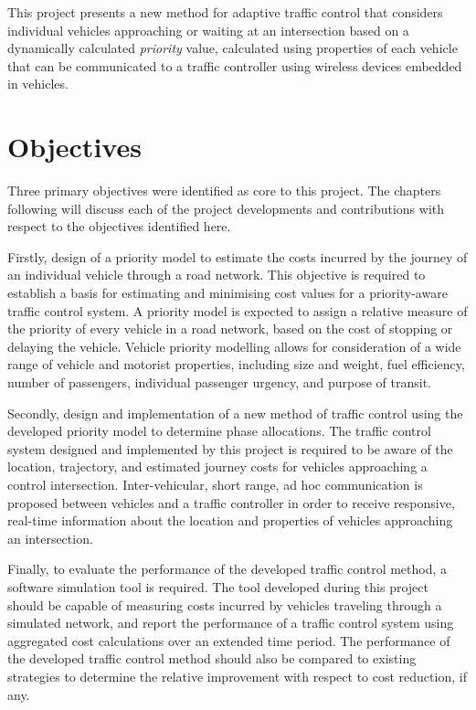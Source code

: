 This project presents a new method for adaptive traffic control that considers individual vehicles approaching or waiting at an intersection based on a dynamically calculated \emph{priority} value, calculated using properties of each vehicle that can be communicated to a traffic controller using wireless devices embedded in vehicles.

\section{Objectives}

Three primary objectives were identified as core to this project. The chapters following will discuss each of the project developments and contributions with respect to the objectives identified here.

Firstly, design of a priority model to estimate the costs incurred by the journey of an individual vehicle through a road network. This objective is required to establish a basis for estimating and minimising cost values for a priority-aware traffic control system. A priority model is expected to assign a relative measure of the priority of every vehicle in a road network, based on the cost of stopping or delaying the vehicle. Vehicle priority modelling allows for consideration of a wide range of vehicle and motorist properties, including size and weight, fuel efficiency, number of passengers, individual passenger urgency, and purpose of transit. 

Secondly, design and implementation of a new method of traffic control using the developed priority model to determine phase allocations. The traffic control system designed and implemented by this project is required to be aware of the location, trajectory, and estimated journey costs for vehicles approaching a control intersection. Inter-vehicular, short range, ad hoc communication is proposed between vehicles and a traffic controller in order to receive responsive, real-time information about the location and properties of vehicles approaching an intersection. 

Finally, to evaluate the performance of the developed traffic control method, a software simulation tool is required. The tool developed during this project should be capable of measuring costs incurred by vehicles traveling through a simulated network, and report the performance of a traffic control system using aggregated cost calculations over an extended time period. The performance of the developed traffic control method should also be compared to existing strategies to determine the relative improvement with respect to cost reduction, if any. 


